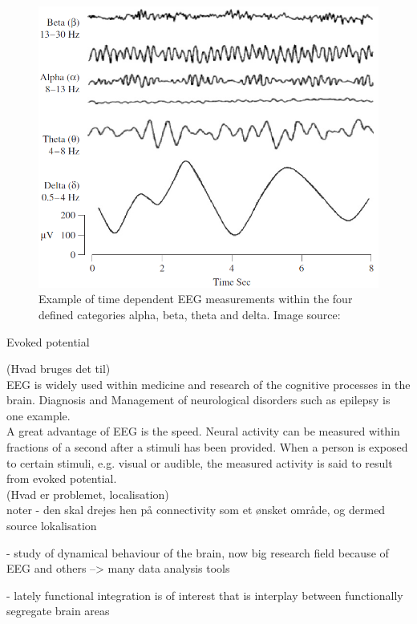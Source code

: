 \begin{figure}[h]
    \centering
    \includegraphics[scale=0.65]{figurs/EEG_example.png}
    \caption{Example of time dependent EEG measurements within the four defined categories alpha, beta, theta and delta. Image source: \cite{EEGsignalprocessing}}
    \label{fig:EEG_example}
\end{figure}
Evoked potential 


(Hvad bruges det til)\\
EEG is widely used within medicine and research of the cognitive processes in the brain. Diagnosis and Management of neurological disorders such as epilepsy is one example. \\   
A great advantage of EEG is the speed. Neural activity can be measured within fractions of a second after a stimuli has been provided\cite[p. 3]{fundamentalEEG}. When a person is exposed to certain stimuli, e.g. visual or audible, the measured activity is said to result from evoked potential.\\

  

(Hvad er problemet, localisation)\\

noter
- den skal drejes hen på connectivity som et ønsket område, og dermed source lokalisation 

- study of dynamical behaviour of the brain, now big research field because of EEG and others --> many data analysis tools

- lately functional integration is of interest that is interplay between functionally segregate brain areas 



